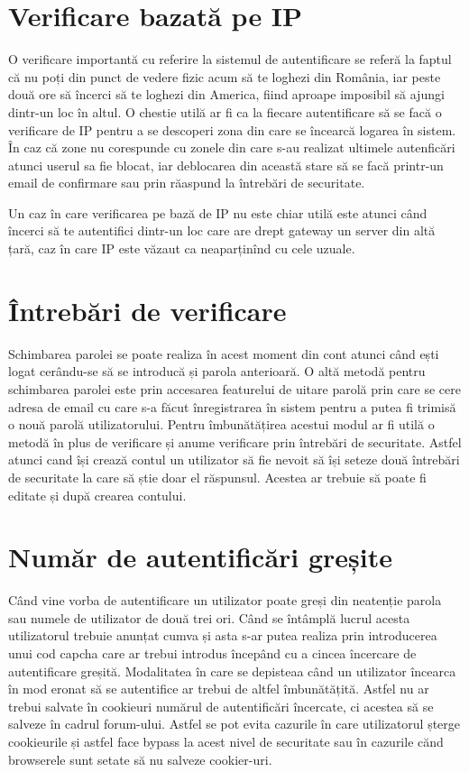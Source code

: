 \section{Verificare bazată pe IP}

O verificare importantă cu referire la sistemul de autentificare se referă la faptul că nu poți din punct de vedere fizic acum să te loghezi din România, iar peste două ore să încerci să te loghezi din America, fiind aproape imposibil să ajungi dintr-un loc în altul. O chestie utilă ar fi ca la fiecare autentificare să se facă o verificare de IP pentru a se descoperi zona din care se încearcă logarea în sistem. În caz că zone nu corespunde cu zonele din care s-au realizat ultimele autenficări atunci userul sa fie blocat, iar deblocarea din această stare să se facă printr-un email de confirmare sau prin răaspund la întrebări de securitate.

Un caz în care verificarea pe bază de IP nu este chiar utilă este atunci când încerci să te autentifici dintr-un loc care are drept gateway un server din altă țară, caz în care IP este văzaut ca neaparținînd cu cele uzuale.

\section{Întrebări de verificare}

Schimbarea parolei se poate realiza în acest moment din cont atunci când ești logat cerându-se să se introducă și parola anterioară. O altă metodă pentru schimbarea parolei este prin accesarea featurelui de uitare parolă prin care se cere adresa de email cu care s-a făcut înregistrarea în sistem pentru a putea fi trimisă o nouă parolă utilizatorului. Pentru îmbunătățirea acestui modul ar fi utilă o metodă în plus de verificare și anume verificare prin întrebări de securitate. Astfel atunci cand își crează contul un utilizator să fie nevoit să își seteze două întrebări de securitate la care să știe doar el răspunsul. Acestea ar trebuie să poate fi editate și după crearea contului.

\section{Număr de autentificări greșite}

Când vine vorba de autentificare un utilizator poate greși din neatenție parola sau numele de utilizator de două trei ori. Când se întâmplă lucrul acesta utilizatorul trebuie anunțat cumva și asta s-ar putea realiza prin introducerea unui cod capcha care ar trebui introdus începând cu a cincea încercare de autentificare greșită. Modalitatea în care se depisteaa când un utilizator încearca în mod eronat să se autentifice ar trebui de altfel îmbunătățită. Astfel nu ar trebui salvate în cookieuri numărul de autentificări încercate, ci acestea să se salveze în cadrul forum-ului. Astfel se pot evita cazurile în care utilizatorul șterge cookieurile și astfel face bypass la acest nivel de securitate sau în cazurile cănd browserele sunt setate să nu salveze cookier-uri.

